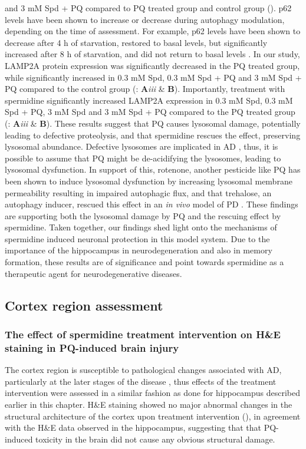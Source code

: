 and 3 mM Spd + PQ compared to PQ treated group and control group (). p62 levels have been shown to increase or decrease during autophagy modulation, depending on the time of assessment. For example, p62 levels have been shown to decrease after 4 h of starvation, restored to basal levels, but significantly increased after 8 h of starvation, and did not return to basal levels \citep{sahani2014}. In our study, LAMP2A protein expression was significantly decreased in the PQ treated group, while significantly increased in 0.3 mM Spd, 0.3 mM Spd + PQ and 3 mM Spd + PQ compared to the control group (: \textbf{A}\textit{iii} \& \textbf{B}). Importantly, treatment with spermidine significantly increased LAMP2A expression in 0.3 mM Spd, 0.3 mM Spd + PQ, 3 mM Spd and 3 mM Spd + PQ compared to the PQ treated group (: \textbf{A}\textit{iii} \& \textbf{B}). These results suggest that PQ causes lysosomal damage, potentially leading to defective proteolysis, and that spermidine rescues the effect, preserving lysosomal abundance. Defective lysosomes are implicated in AD \citep{Nixon2011}, thus, it is possible to assume that PQ might be de-acidifying the lysosomes, leading to lysosomal dysfunction. In support of this, rotenone, another pesticide like PQ has been shown to induce lysosomal dysfunction by increasing lysosomal membrane permeability resulting in impaired autophagic flux, and that trehalose, an autophagy inducer, rescued this effect in an \textit{in vivo} model of PD \citep{Wu2015}. These findings are supporting both the lysosomal damage by PQ and the rescuing effect by spermidine. Taken together, our findings shed light onto the mechanisms of spermidine induced neuronal protection in this model system. Due to the importance of the hippocampus in neurodegeneration and also in memory formation, these results are of significance and point towards spermidine as a therapeutic agent for neurodegenerative diseases.

\subsection{Cortex region assessment}
\subsubsection{The effect of spermidine treatment intervention on H\&E staining in PQ-induced brain injury}
The cortex region is susceptible to pathological changes associated with AD, particularly at the later stages of the disease \citep{Braak1998,Braak1991,Braak2012}, thus effects of the treatment intervention were assessed in a similar fashion as done for hippocampus described earlier in this chapter. H\&E staining showed no major abnormal changes in the structural architecture of the cortex upon treatment intervention (), in agreement with the H\&E data observed in the hippocampus, suggesting that that PQ-induced toxicity in the brain did not cause any obvious structural damage. 

